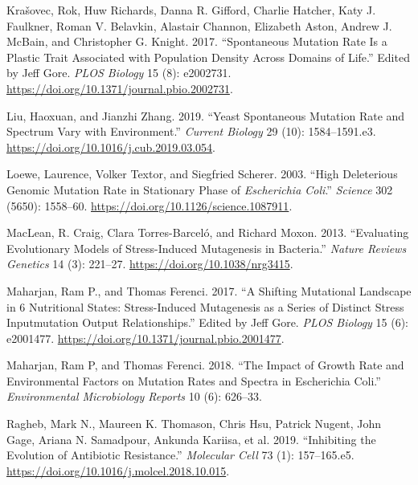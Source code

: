 \documentclass[
  12pt,
  letterpaper,
  DIV=11,
  numbers=noendperiod]{scrreprt}
\newlength{\cslhangindent}
\newlength{\cslentryspacingunit} %
\newenvironment{CSLReferences}[2] %
 {%
  \setlength{\parindent}{0pt}
  \ifodd #1
  \let\oldpar\par
  \def\par{\hangindent=\cslhangindent\oldpar}
  \fi
  \setlength{\parskip}{#2\cslentryspacingunit}
 }%
 {}
\begin{document}
\begin{CSLReferences}{1}{0}
\leavevmode{}%
Krašovec, Rok, Huw Richards, Danna R. Gifford, Charlie Hatcher, Katy J.
Faulkner, Roman V. Belavkin, Alastair Channon, Elizabeth Aston, Andrew
J. McBain, and Christopher G. Knight. 2017. {``Spontaneous Mutation Rate
Is a Plastic Trait Associated with Population Density Across Domains of
Life.''} Edited by Jeff Gore. \emph{PLOS Biology} 15 (8): e2002731.
\url{https://doi.org/10.1371/journal.pbio.2002731}.

\leavevmode{}%
Liu, Haoxuan, and Jianzhi Zhang. 2019. {``Yeast Spontaneous Mutation
Rate and Spectrum Vary with Environment.''} \emph{Current Biology} 29
(10): 1584--1591.e3. \url{https://doi.org/10.1016/j.cub.2019.03.054}.

\leavevmode{}%
Loewe, Laurence, Volker Textor, and Siegfried Scherer. 2003. {``High
Deleterious Genomic Mutation Rate in Stationary Phase of
{\emph{Escherichia Coli}}.''} \emph{Science} 302 (5650): 1558--60.
\url{https://doi.org/10.1126/science.1087911}.

\leavevmode{}%
MacLean, R. Craig, Clara Torres-Barceló, and Richard Moxon. 2013.
{``Evaluating Evolutionary Models of Stress-Induced Mutagenesis in
Bacteria.''} \emph{Nature Reviews Genetics} 14 (3): 221--27.
\url{https://doi.org/10.1038/nrg3415}.

\leavevmode{}%
Maharjan, Ram P., and Thomas Ferenci. 2017. {``A Shifting Mutational
Landscape in 6 Nutritional States: Stress-Induced Mutagenesis as a
Series of Distinct Stress Input{\textendash}mutation Output
Relationships.''} Edited by Jeff Gore. \emph{PLOS Biology} 15 (6):
e2001477. \url{https://doi.org/10.1371/journal.pbio.2001477}.

\leavevmode{}%
Maharjan, Ram P, and Thomas Ferenci. 2018. {``The Impact of Growth Rate
and Environmental Factors on Mutation Rates and Spectra in Escherichia
Coli.''} \emph{Environmental Microbiology Reports} 10 (6): 626--33.

\leavevmode{}%
Ragheb, Mark N., Maureen K. Thomason, Chris Hsu, Patrick Nugent, John
Gage, Ariana N. Samadpour, Ankunda Kariisa, et al. 2019. {``Inhibiting
the Evolution of Antibiotic Resistance.''} \emph{Molecular Cell} 73 (1):
157--165.e5. \url{https://doi.org/10.1016/j.molcel.2018.10.015}.

\end{CSLReferences}
\end{document}
